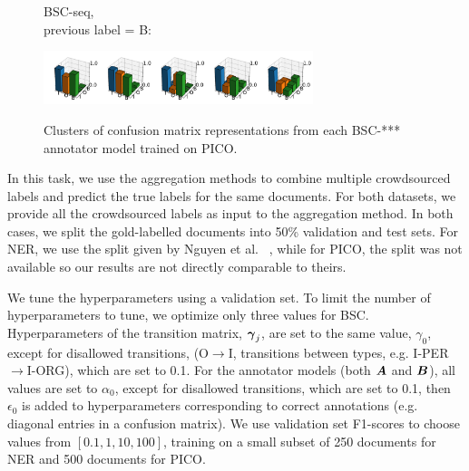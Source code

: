 \begin{figure}
\begin{minipage}[b][1cm][l]{0.2\textwidth}
BSC-seq,\\
 previous label = B:
\end{minipage}
  \includegraphics[width=0.7\textwidth, clip=True, trim=20 20 0 28]{figures/worker_models/seq_prev2}
\\
\caption{Clusters of confusion matrix representations from each BSC-*** annotator model trained on PICO. 
}
\label{fig:conf_mat_clusters}
\end{figure}
In this task, we use the aggregation methods to combine multiple crowdsourced labels and predict the true labels for the same documents. 
For both datasets, we provide all the crowdsourced labels as input to the aggregation method. 
In both cases, we split the gold-labelled documents into 50\% validation and test sets. 
For NER, we use the split given by Nguyen et al. ~,
while for PICO, the split was not available so our results are not directly comparable to theirs.

We tune the hyperparameters using a validation set. To limit the number of hyperparameters to tune, we optimize only three values for BSC.
Hyperparameters of the transition matrix, $\boldsymbol\gamma_j$, are set to the same value, 
$\gamma_0$, except for disallowed transitions, (O$\rightarrow$I, transitions between types, e.g. I-PER$\rightarrow$I-ORG), which are set to 0.1.  
For the annotator models (both $\boldsymbol A$ and $\boldsymbol B$),
all values are set to $\alpha_0$, except for disallowed transitions, which are set to 0.1, then $\epsilon_0$ is added to hyperparameters 
corresponding to correct annotations (e.g. diagonal entries in a confusion matrix).
We use validation set F1-scores to choose values from $[0.1, 1, 10, 100]$, 
training on a small subset of 250 documents for NER and 500 documents for PICO. 

